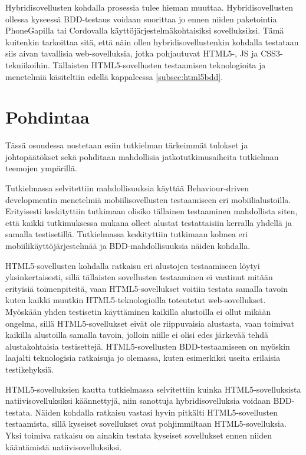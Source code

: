 \documentclass[finnish,nonumbib,nocopyright]{gradu2}
\begin{document}
Hybridisovellusten kohdalla prosessia tulee hieman muuttaa. Hybridisovellusten ollessa kyseessä BDD-testaus voidaan suorittaa jo ennen niiden paketointia PhoneGapilla tai Cordovalla käyttöjärjestelmäkohtaisiksi sovelluksiksi. Tämä kuitenkin tarkoittaa sitä, että näin ollen hybridisovellustenkin kohdalla testataan siis aivan tavallisia web-sovelluksia, jotka pohjautuvat HTML5-, JS ja CSS3-tekniikoihin. Tällaisten HTML5-sovellusten testaamisen teknologioita ja menetelmiä käsiteltiin edellä kappaleessa \ref{subsec:html5bdd}. 
\chapter{Pohdintaa}
Tässä osuudessa nostetaan esiin tutkielman tärkeimmät tulokset ja johtopäätökset sekä pohditaan mahdollisia jatkotutkimusaiheita tutkielman teemojen ympärillä.

Tutkielmassa selvitettiin mahdollisuuksia käyttää Behaviour-driven developmentin menetelmiä mobiilisovellusten testaamiseen eri mobiilialustoilla. Erityisesti keskityttiin tutkimaan olisiko tällainen testaaminen mahdollista siten, että kaikki tutkimuksessa mukana olleet alustat testattaisiin kerralla yhdellä ja samalla testisetillä. Tutkielmassa keskityttiin tutkimaan kolmea eri mobiilikäyttöjärjestelmää ja BDD-mahdollisuuksia näiden kohdalla.

HTML5-sovellusten kohdalla ratkaisu eri alustojen testaamiseen löytyi yksinkertaisesti, sillä tällaisten sovellusten testaaminen ei vaatinut mitään erityisiä toimenpiteitä, vaan HTML5-sovellukset voitiin testata samalla tavoin kuten kaikki muutkin HTML5-teknologioilla toteutetut web-sovellukset. Myöskään yhden testisetin käyttäminen kaikilla alustoilla ei ollut mikään ongelma, sillä HTML5-sovellukset eivät ole riippuvaisia alustasta, vaan toimivat kaikilla alustoilla samalla tavoin, jolloin niille ei olisi edes järkevää tehdä alustakohtaisia testisettejä. HTML5-sovellusten BDD-testaamiseen on myöskin laajalti teknologisia ratkaisuja jo olemassa, kuten esimerkiksi useita erilaisia testikehyksiä. 

HTML5-sovelluksien kautta tutkielmassa selvitettiin kuinka HTML5-sovelluksista natiivisovelluksiksi käännettyjä, niin sanottuja hybridisovelluksia voidaan BDD-testata. Näiden kohdalla ratkaisu vastasi hyvin pitkälti HTML5-sovellusten testaamista, sillä kyseiset sovellukset ovat pohjimmiltaan HTML5-sovelluksia. Yksi toimiva ratkaisu on ainakin testata kyseiset sovellukset ennen niiden kääntämistä natiivisovelluksiksi.
\end{document}
